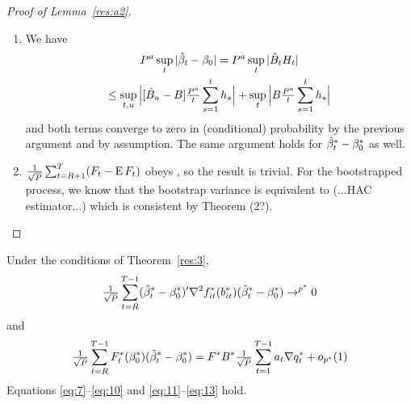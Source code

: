 \documentclass[12pt,fleqn]{article}
\begin{document}
\begin{proof}[Proof of Lemma~\ref{res:a2}]
\begin{enumerate}
    Since
    \[
    \omax{t} \Big|\sum_{s=K_{j^*_t - 1}+1}^t h_s^*/t \Big| \leq \sum_{i=1}^{J} \max_{t = K_{i-1}+1,\dots,K_i} \Big| \sum_{s=K_{i-1}+1}^t h_s^*/t \Big|
    \]
    the proof that the second component converges to zero is similar.
  \item We have
    \begin{multline}
      P^a \sup_t | \hat{\beta}_t - \beta_0 | = P^a \sup_t |\hat{B}_{t}
      H_{t}| \\ \leq \sup_{t,u} \Big| [ \hat{B}_u - B]
      \tfrac{P^a}{t} \sum_{s=1}^t h_{s} \Big| + \sup_{t} \Big|
      B \tfrac{P^a}{t} \sum_{s=1}^t h_{s} \Big|
    \end{multline}
    and both terms converge to zero in (conditional) probability by
    the previous argument and by assumption.  The same argument holds
    for $\hat{\beta}_t^{*} - \beta_0^*$ as well.
  \item $\tfrac{1}{\sqrt{P}} \sum_{t=R+1}^T (F_t - \operatorname{E} F_t)$ obeys
     \clt, so the result is trivial. For the
    bootstrapped process, we know that the bootstrap variance is
    equivalent to (...HAC estimator...) which is consistent by
     Theorem (2?).\qedhere
  \end{enumerate}
\end{proof}

\begin{lema}\label{res:a4}
  Under the conditions of Theorem~\ref{res:3},
  \begin{equation}\label{eq:16}
    \tfrac{1}{\sqrt{P}} \sum_{t=R}^{T-1} (\hat \beta_t^* - \beta_0^*)' \nabla^2 f_{it}^*(b_{it}^*) (\hat \beta_t^* - \beta_0^*) \to^{p^*} 0
  \end{equation}
  and
  \begin{equation}\label{eq:17}
    \tfrac{1}{\sqrt{P}} \sum_{t=R}^{T-1} F_t^*(\beta_0^*) (\hat \beta_t^* - \beta_0^*)
    = F^* B^* \tfrac{1}{\sqrt{P}} \sum_{t=1}^{T-1} a_t \nabla q_t^* + o_{p^*}(1)
  \end{equation}
Equations
  \eqref{eq:7}--\eqref{eq:10} and \eqref{eq:11}--\eqref{eq:13} hold.
\end{lema}
\end{document}
